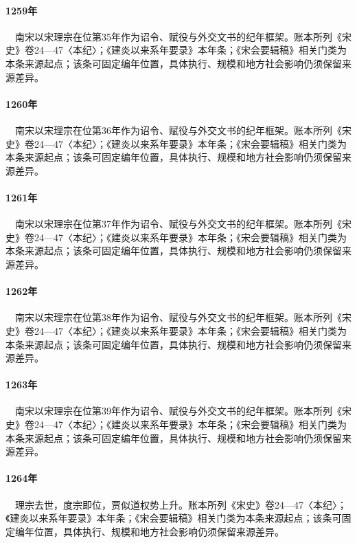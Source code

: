 \paragraph{1259年}　南宋以宋理宗在位第35年作为诏令、赋役与外交文书的纪年框架。账本所列《宋史》卷24—47〈本纪〉；《建炎以来系年要录》本年条；《宋会要辑稿》相关门类为本条来源起点；该条可固定编年位置，具体执行、规模和地方社会影响仍须保留来源差异。

\paragraph{1260年}　南宋以宋理宗在位第36年作为诏令、赋役与外交文书的纪年框架。账本所列《宋史》卷24—47〈本纪〉；《建炎以来系年要录》本年条；《宋会要辑稿》相关门类为本条来源起点；该条可固定编年位置，具体执行、规模和地方社会影响仍须保留来源差异。

\paragraph{1261年}　南宋以宋理宗在位第37年作为诏令、赋役与外交文书的纪年框架。账本所列《宋史》卷24—47〈本纪〉；《建炎以来系年要录》本年条；《宋会要辑稿》相关门类为本条来源起点；该条可固定编年位置，具体执行、规模和地方社会影响仍须保留来源差异。

\paragraph{1262年}　南宋以宋理宗在位第38年作为诏令、赋役与外交文书的纪年框架。账本所列《宋史》卷24—47〈本纪〉；《建炎以来系年要录》本年条；《宋会要辑稿》相关门类为本条来源起点；该条可固定编年位置，具体执行、规模和地方社会影响仍须保留来源差异。

\paragraph{1263年}　南宋以宋理宗在位第39年作为诏令、赋役与外交文书的纪年框架。账本所列《宋史》卷24—47〈本纪〉；《建炎以来系年要录》本年条；《宋会要辑稿》相关门类为本条来源起点；该条可固定编年位置，具体执行、规模和地方社会影响仍须保留来源差异。

\paragraph{1264年}　理宗去世，度宗即位，贾似道权势上升。账本所列《宋史》卷24—47〈本纪〉；《建炎以来系年要录》本年条；《宋会要辑稿》相关门类为本条来源起点；该条可固定编年位置，具体执行、规模和地方社会影响仍须保留来源差异。

